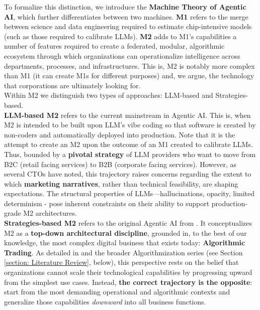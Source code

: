 \documentclass{article}
\begin{document}
To formalize this distinction, we introduce the \textbf{Machine Theory of Agentic AI}, which further differentiates between two machines. \textbf{M1} refers to the merge between science and data engineering required to estimate chip-intensive models (such as those required to calibrate LLMs). \textbf{M2} adds to M1’s capabilities a number of features required to create a federated, modular, algorithmic ecosystem through which organizations can operationalize intelligence across departments, processes, and infrastructures. This is, M2 is notably more complex than M1 (it can create M1s for different purposes) and, we argue, the technology that corporations are ultimately looking for.\\

Within M2 we distinguish two types of approaches: LLM-based and Strategies-based.\\

\textbf{LLM-based M2} refers to the current mainstream in Agentic AI. This is, when M2 is intended to be built upon LLM’s vibe coding so that software is created by non-coders and automatically deployed into production. Note that it is the attempt to create an M2 upon the outcome of an M1 created to calibrate LLMs. Thus, bounded by a \textbf{pivotal strategy} of LLM providers who want to move from B2C (retail facing services) to B2B (corporate facing services). However, as several CTOs have noted, this trajectory raises concerns regarding the extent to which \textbf{marketing narratives}, rather than technical feasibility, are shaping expectations. The structural properties of LLMs—hallucinations, opacity, limited determinism - pose inherent constraints on their ability to support production-grade M2 architectures.\\

\textbf{Strategies-based M2} refers to the original Agentic AI from \cite{Data MAPs}. It conceptualizes M2 as a \textbf{top-down architectural discipline}, grounded in, to the best of our knowledge, the most complex digital business that exists today: \textbf{Algorithmic Trading}. As detailed in \cite{Vertical Integration} and the broader Algorithmization series (see Section \ref{section: Literature Review}, below), this perspective rests on the belief that organizations cannot scale their technological capabilities by progressing upward from the simplest use cases. Instead, \textbf{the correct trajectory is the opposite}: start from the most demanding operational and algorithmic contexts and generalize those capabilities \textit{downward} into all business functions.\\
\end{document}
